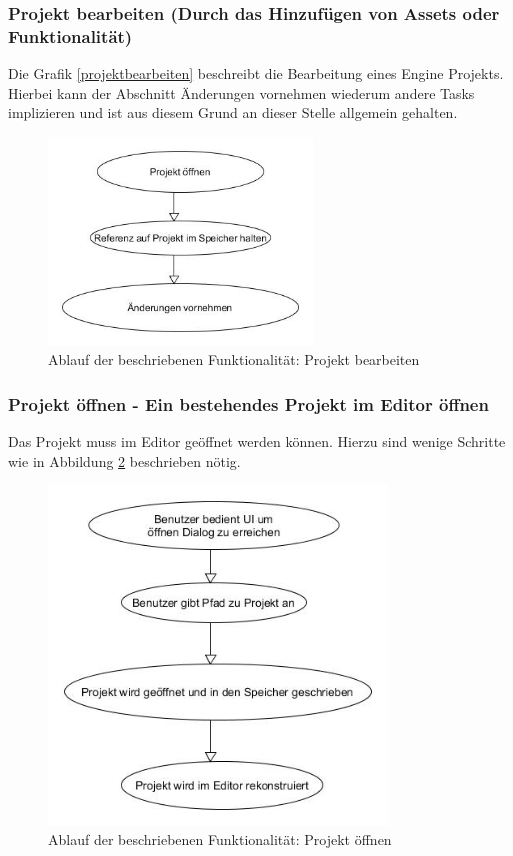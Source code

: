 \documentclass[pagesize, paper=a4, fontsize=12pt, titlepage=true, headings=small, headnosepline, abstractoff, liststotoc, nochapterprefix, plainheadsepline, twoside]{scrreprt}
\begin{document}
\subsubsection{Projekt bearbeiten (Durch das Hinzufügen von Assets oder Funktionalität)}
Die Grafik \ref{projektbearbeiten} beschreibt die Bearbeitung eines Engine Projekts. Hierbei kann der Abschnitt Änderungen vornehmen wiederum andere Tasks implizieren und ist aus diesem Grund an dieser Stelle allgemein gehalten.
\begin{figure}[ht]
	\centering
	\includegraphics[width=7cm]{Bilder/ProjektBearbeiten.jpg}
	\caption{Ablauf der beschriebenen Funktionalität: Projekt bearbeiten}
	\label{re:projektbearbeiten}
\end{figure}

\subsubsection{Projekt öffnen - Ein bestehendes Projekt im Editor öffnen}
Das Projekt muss im Editor geöffnet werden können. Hierzu sind wenige Schritte wie in Abbildung \ref{re:projektöffnen} beschrieben nötig.
\begin{figure}[ht]
	\centering
	\includegraphics[width=9cm]{Bilder/ProjektOeffnen.jpg}
	\caption{Ablauf der beschriebenen Funktionalität: Projekt öffnen}
	\label{re:projektöffnen}
\end{figure}
\end{document}
